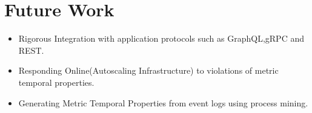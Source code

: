 \documentclass[twocolumn]{article}
\begin{document}
\section{Future Work}
\begin{itemize}
	\item Rigorous Integration with application protocols such as GraphQL,gRPC and REST.
	\item Responding Online(Autoscaling Infrastructure) to violations of metric temporal properties.
	\item Generating Metric Temporal Properties from event logs using process mining.
\end{itemize}




\end{document}

